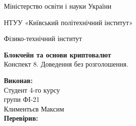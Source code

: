 \documentclass{article}
\begin{document}
    \begin{titlepage}
        \begin{center}

        Міністерство освіти і науки України
        
        НТУУ «Київський політехнічний інститут»
        
        Фізико-технічний інститут
        \vspace{3.3cm}
        
        {\textbf{Блокчейн та основи криптовалют}\\Конспект 8. Доведення без розголошення.}

        \vspace{8.5cm}

        \begin{flushright}
            \textbf{Виконав:}\\Студент 4-го курсу\\групи ФІ-21\\Климентьєв Максим\\
            \textbf{Перевірив:}\\\text{\_\_\_\_\_\_\_\_\_\_\_\_\_\_\_\_\_\_}
        \end{flushright}

        \end{center}
    \end{titlepage}
    \newpage

    \tableofcontents
    \cleardoublepage
    \setcounter{page}{3}

    \newpage
\end{document}
